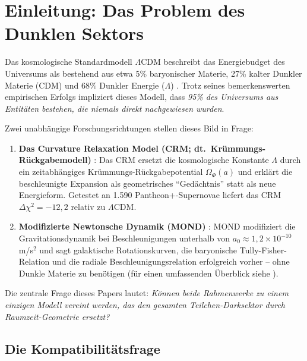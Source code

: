 \documentclass[aps,prd,twocolumn,superscriptaddress,nofootinbib,floatfix]{revtex4-2}
\begin{document}
\maketitle


\section{Einleitung: Das Problem des Dunklen Sektors}
\label{sec:intro}

Das kosmologische Standardmodell $\Lambda$CDM beschreibt das Energiebudget des Universums als bestehend aus etwa 5\% baryonischer Materie, 27\% kalter Dunkler Materie (CDM) und 68\% Dunkler Energie ($\Lambda$) \cite{Planck2020}. Trotz seines bemerkenswerten empirischen Erfolgs impliziert dieses Modell, dass \textit{95\% des Universums aus Entitäten bestehen, die niemals direkt nachgewiesen wurden}.

Zwei unabhängige Forschungsrichtungen stellen dieses Bild in Frage:

\begin{enumerate}
\item \textbf{Das Curvature Relaxation Model (CRM; dt.\ Krümmungs-Rückgabemodell)} \cite{Geiger2026}: Das CRM ersetzt die kosmologische Konstante $\Lambda$ durch ein zeitabhängiges Krümmungs-Rückgabepotential $\Omega_\Phi(a)$ und erklärt die beschleunigte Expansion als geometrisches "`Gedächtnis"' statt als neue Energieform. Getestet an 1.590 Pantheon+-Supernovae liefert das CRM $\Delta\chi^2 = -12{,}2$ relativ zu $\Lambda$CDM.

\item \textbf{Modifizierte Newtonsche Dynamik (MOND)} \cite{Milgrom1983}: MOND modifiziert die Gravitationsdynamik bei Beschleunigungen unterhalb von $a_0 \approx 1{,}2 \times 10^{-10}$\,m/s$^2$ und sagt galaktische Rotationskurven, die baryonische Tully-Fisher-Relation \cite{McGaugh2016} und die radiale Beschleunigungsrelation \cite{Lelli2017} erfolgreich vorher -- ohne Dunkle Materie zu benötigen (für einen umfassenden Überblick siehe \cite{FamaeyMcGaugh2012}).
\end{enumerate}

Die zentrale Frage dieses Papers lautet: \textit{Können beide Rahmenwerke zu einem einzigen Modell vereint werden, das den gesamten Teilchen-Darksektor durch Raumzeit-Geometrie ersetzt?}

\subsection{Die Kompatibilitätsfrage}
\end{document}
